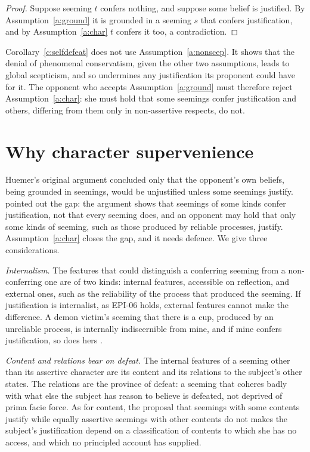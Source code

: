 \documentclass{situationist-preprint}
\begin{document}
\begin{proof}
Suppose seeming $t$ confers nothing, and suppose some belief is justified. By Assumption~\ref{a:ground} it is grounded in a seeming $s$ that confers justification, and by Assumption~\ref{a:char} $t$ confers it too, a contradiction.
\end{proof}

Corollary~\ref{c:selfdefeat} does not use Assumption~\ref{a:nonscep}. It shows that the denial of phenomenal conservatism, given the other two assumptions, leads to global scepticism, and so undermines any justification its proponent could have for it. The opponent who accepts Assumption~\ref{a:ground} must therefore reject Assumption~\ref{a:char}: she must hold that some seemings confer justification and others, differing from them only in non-assertive respects, do not.

\section{Why character supervenience}

Huemer's original argument concluded only that the opponent's own beliefs, being grounded in seemings, would be unjustified unless some seemings justify. \citet{DePoe2011} pointed out the gap: the argument shows that seemings of some kinds confer justification, not that every seeming does, and an opponent may hold that only some kinds of seeming, such as those produced by reliable processes, justify. Assumption~\ref{a:char} closes the gap, and it needs defence. We give three considerations.

\emph{Internalism.} The features that could distinguish a conferring seeming from a non-conferring one are of two kinds: internal features, accessible on reflection, and external ones, such as the reliability of the process that produced the seeming. If justification is internalist, as EPI-06 holds, external features cannot make the difference. A demon victim's seeming that there is a cup, produced by an unreliable process, is internally indiscernible from mine, and if mine confers justification, so does hers \citep{Cohen1984}.

\emph{Content and relations bear on defeat.} The internal features of a seeming other than its assertive character are its content and its relations to the subject's other states. The relations are the province of defeat: a seeming that coheres badly with what else the subject has reason to believe is defeated, not deprived of prima facie force. As for content, the proposal that seemings with some contents justify while equally assertive seemings with other contents do not makes the subject's justification depend on a classification of contents to which she has no access, and which no principled account has supplied.
\end{document}
